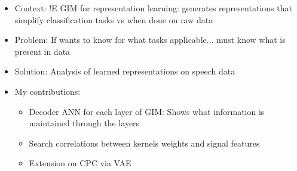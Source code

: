 \begin{itemize}
	\item Context: !E GIM for representation learning: generates representations that simplify classification tasks vs when done on raw data
	\item Problem: If wants to know for what tasks applicable... must know what is present in data
	\item Solution: Analysis of learned representations on speech data
	\item My contributions: 
	\begin{itemize}
		\item Decoder ANN for each layer of GIM: Shows what information is maintained through the layers
		\item Search correlations between kernels weights and signal features
		\item Extension on CPC via VAE
	\end{itemize}
\end{itemize}



